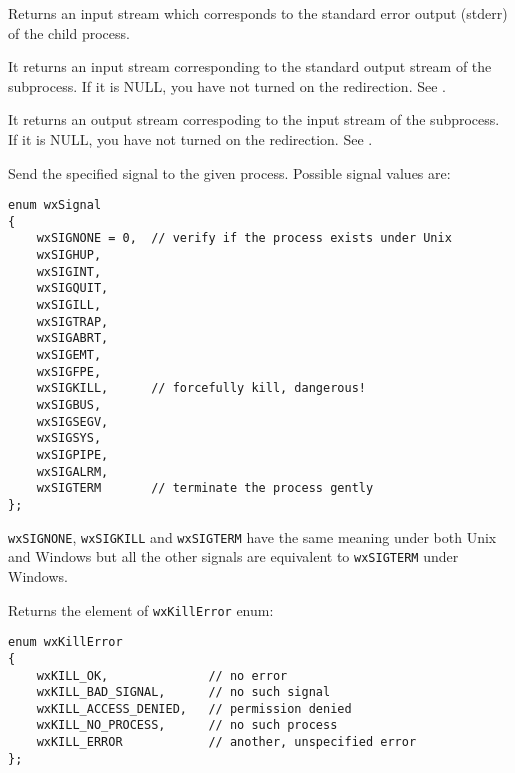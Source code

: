 \label{wxprocessgeterrorstream}


Returns an input stream which corresponds to the standard error output (stderr)
of the child process.

\label{wxprocessgetinputstream}


It returns an input stream corresponding to the standard output stream of the
subprocess. If it is NULL, you have not turned on the redirection.
See .

\label{wxprocessgetoutputstream}


It returns an output stream correspoding to the input stream of the subprocess.
If it is NULL, you have not turned on the redirection.
See .

\label{wxprocesskill}


Send the specified signal to the given process. Possible signal values are:

\begin{verbatim}
enum wxSignal
{
    wxSIGNONE = 0,  // verify if the process exists under Unix
    wxSIGHUP,
    wxSIGINT,
    wxSIGQUIT,
    wxSIGILL,
    wxSIGTRAP,
    wxSIGABRT,
    wxSIGEMT,
    wxSIGFPE,
    wxSIGKILL,      // forcefully kill, dangerous!
    wxSIGBUS,
    wxSIGSEGV,
    wxSIGSYS,
    wxSIGPIPE,
    wxSIGALRM,
    wxSIGTERM       // terminate the process gently
};
\end{verbatim}

{\tt wxSIGNONE}, {\tt wxSIGKILL} and {\tt wxSIGTERM} have the same meaning
under both Unix and Windows but all the other signals are equivalent to
{\tt wxSIGTERM} under Windows.

Returns the element of {\tt wxKillError} enum:

\begin{verbatim}
enum wxKillError
{
    wxKILL_OK,              // no error
    wxKILL_BAD_SIGNAL,      // no such signal
    wxKILL_ACCESS_DENIED,   // permission denied
    wxKILL_NO_PROCESS,      // no such process
    wxKILL_ERROR            // another, unspecified error
};
\end{verbatim}

